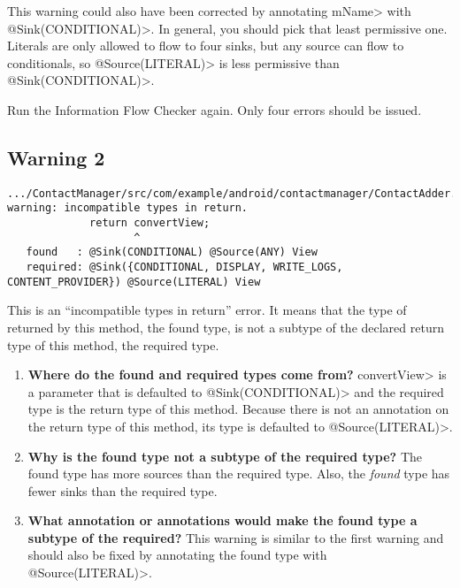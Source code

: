 \begin{enumerate}

 This warning could also have been corrected by annotating \<mName> with \<@Sink(CONDITIONAL)>.
   In general, you should pick that least permissive one.  Literals are only 
   allowed to flow to four sinks, but any source can flow to conditionals, so
 \<@Source(LITERAL)> is less permissive than \<@Sink(CONDITIONAL)>.
 \end{enumerate}
 Run the Information Flow Checker again.  Only four errors should be issued.
 
 \subsection{Warning 2}
 \begin{Verbatim}
.../ContactManager/src/com/example/android/contactmanager/ContactAdder.java:387: 
warning: incompatible types in return.
             return convertView;
                    ^
   found   : @Sink(CONDITIONAL) @Source(ANY) View
   required: @Sink({CONDITIONAL, DISPLAY, WRITE_LOGS, CONTENT_PROVIDER}) @Source(LITERAL) View
\end{Verbatim} 
This is an ``incompatible types in return'' error.  It means that the type
of returned by this method, the found type, is not a subtype of the declared 
return type of this method, the required type.
 \begin{enumerate}

\item\textbf{Where do the found and required types come from?}
\<convertView> is a parameter that is defaulted to \<@Sink(CONDITIONAL)> and 
the required type is the return type of this method. Because there is not an
annotation on the return type of this method, its type is defaulted to \<@Source(LITERAL)>.

  \item\textbf{ Why is the found type not a subtype of the required type?}
The found type has more sources than the required type.
 Also, the \emph{found} type has fewer sinks 
than the required type.

  \item\textbf{What annotation or annotations would make the found type a
   subtype of the required?} This warning is similar to the first warning and 
   should also be fixed by annotating the found type with \<@Source(LITERAL)>.\newline
  
   \end{enumerate}

